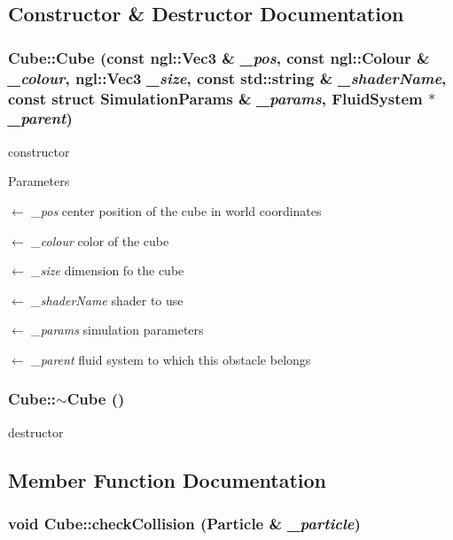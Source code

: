 \subsection{Constructor \& Destructor Documentation}
\hypertarget{classCube_a4e53462d63d55146162a2b0dec143b9c}{
\subsubsection[{Cube}]{\setlength{\rightskip}{0pt plus 5cm}Cube::Cube (const ngl::Vec3 \& {\em \_\-pos}, \/  const ngl::Colour \& {\em \_\-colour}, \/  ngl::Vec3 {\em \_\-size}, \/  const std::string \& {\em \_\-shaderName}, \/  const struct {\bf SimulationParams} \& {\em \_\-params}, \/  {\bf FluidSystem} $\ast$ {\em \_\-parent})}}
\label{classCube_a4e53462d63d55146162a2b0dec143b9c}


constructor 
\begin{DoxyParams}{Parameters}
\item[\mbox{$\leftarrow$} {\em \_\-pos}]center position of the cube in world coordinates \item[\mbox{$\leftarrow$} {\em \_\-colour}]color of the cube \item[\mbox{$\leftarrow$} {\em \_\-size}]dimension fo the cube \item[\mbox{$\leftarrow$} {\em \_\-shaderName}]shader to use \item[\mbox{$\leftarrow$} {\em \_\-params}]simulation parameters \item[\mbox{$\leftarrow$} {\em \_\-parent}]fluid system to which this obstacle belongs \end{DoxyParams}
\hypertarget{classCube_aa814e979cecb8c451fdb332ded2cea1e}{
\subsubsection[{$\sim$Cube}]{\setlength{\rightskip}{0pt plus 5cm}Cube::$\sim$Cube ()}}
\label{classCube_aa814e979cecb8c451fdb332ded2cea1e}


destructor 

\subsection{Member Function Documentation}
\hypertarget{classCube_a6e53f829d8ebcbd53ea462e53d07f64f}{
\subsubsection[{checkCollision}]{\setlength{\rightskip}{0pt plus 5cm}void Cube::checkCollision ({\bf Particle} \& {\em \_\-particle})}}
\label{classCube_a6e53f829d8ebcbd53ea462e53d07f64f}


